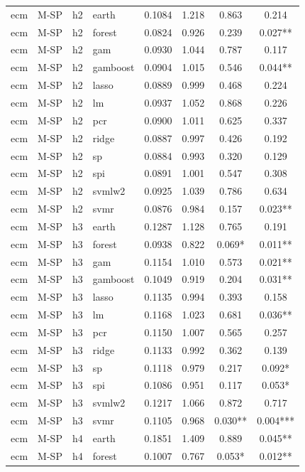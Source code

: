 \begin{ThreePartTable}
\begin{longtable}[t]{llclcccc}
ecm & M-SP & h2 & earth & 0.1084 & 1.218 & 0.863 & 0.214\\
ecm & M-SP & h2 & forest & 0.0824 & 0.926 & 0.239 & 0.027**\\
ecm & M-SP & h2 & gam & 0.0930 & 1.044 & 0.787 & 0.117\\
ecm & M-SP & h2 & gamboost & 0.0904 & 1.015 & 0.546 & 0.044**\\
ecm & M-SP & h2 & lasso & 0.0889 & 0.999 & 0.468 & 0.224\\
ecm & M-SP & h2 & lm & 0.0937 & 1.052 & 0.868 & 0.226\\
ecm & M-SP & h2 & pcr & 0.0900 & 1.011 & 0.625 & 0.337\\
ecm & M-SP & h2 & ridge & 0.0887 & 0.997 & 0.426 & 0.192\\
ecm & M-SP & h2 & sp & 0.0884 & 0.993 & 0.320 & 0.129\\
ecm & M-SP & h2 & spi & 0.0891 & 1.001 & 0.547 & 0.308\\
ecm & M-SP & h2 & svmlw2 & 0.0925 & 1.039 & 0.786 & 0.634\\
ecm & M-SP & h2 & svmr & 0.0876 & 0.984 & 0.157 & 0.023**\\
\addlinespace
ecm & M-SP & h3 & earth & 0.1287 & 1.128 & 0.765 & 0.191\\
ecm & M-SP & h3 & forest & 0.0938 & 0.822 & 0.069* & 0.011**\\
ecm & M-SP & h3 & gam & 0.1154 & 1.010 & 0.573 & 0.021**\\
ecm & M-SP & h3 & gamboost & 0.1049 & 0.919 & 0.204 & 0.031**\\
ecm & M-SP & h3 & lasso & 0.1135 & 0.994 & 0.393 & 0.158\\
ecm & M-SP & h3 & lm & 0.1168 & 1.023 & 0.681 & 0.036**\\
ecm & M-SP & h3 & pcr & 0.1150 & 1.007 & 0.565 & 0.257\\
ecm & M-SP & h3 & ridge & 0.1133 & 0.992 & 0.362 & 0.139\\
ecm & M-SP & h3 & sp & 0.1118 & 0.979 & 0.217 & 0.092*\\
ecm & M-SP & h3 & spi & 0.1086 & 0.951 & 0.117 & 0.053*\\
ecm & M-SP & h3 & svmlw2 & 0.1217 & 1.066 & 0.872 & 0.717\\
ecm & M-SP & h3 & svmr & 0.1105 & 0.968 & 0.030** & 0.004***\\
\addlinespace
ecm & M-SP & h4 & earth & 0.1851 & 1.409 & 0.889 & 0.045**\\
ecm & M-SP & h4 & forest & 0.1007 & 0.767 & 0.053* & 0.012**\\

\end{longtable}
\end{ThreePartTable}
